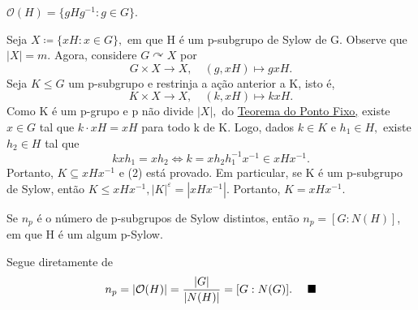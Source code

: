 \documentclass[algebra_notes.tex]{subfiles}
\begin{document}
\(\mathcal{O}(H) = \{gHg^{-1}: g\in G\}\).
\begin{proof*}
	Seja \(X\coloneqq \{xH: x\in G\},\) em que H é um p-subgrupo de Sylow de G. Observe que
	\(|X| = m.\) Agora, considere \(G \curvearrowright X\) por
	\[
		G\times X\rightarrow X,\quad (g, xH)\mapsto gxH.
	\]
	Seja \(K\leq G\) um p-subgrupo e restrinja a ação anterior a K, isto é,
	\[
		K\times X\rightarrow X,\quad (k, xH)\mapsto kxH.
	\]
	Como K é um p-grupo e p não divide \(|X|,\) do \hyperlink{fixed_point}{Teorema do Ponto Fixo,} existe
	\(x\in G\) tal que \(k \cdot xH = xH\) para todo k de K. Logo, dados \(k\in K\) e
	\(h_{1}\in H,\) existe \(h_{2}\in H\) tal que
	\[
		kxh_{1} = xh_{2} \Longleftrightarrow k = xh_{2}h_{1}^{-1}x^{-1}\in xHx^{-1}.
	\]
	Portanto, \(K\subseteq{xHx^{-1}}\) e (2) está provado. Em particular, se K é um p-subgrupo de Sylow,
	então \(K\leq xHx^{-1}, |K|^{\varepsilon } = |xHx^{-1}|\). Portanto, \(K = xHx^{-1}.\) \qedsymbol
\end{proof*}
\begin{crl*}
	Se \(n_{p}\) é o número de p-subgrupos de Sylow distintos, então \(n_{p} = [G:N(H)]\), em
	que H é um algum p-Sylow.
\end{crl*}
\begin{proof*}
	Segue diretamente de
	\[
		n_{p} = |\mathcal{O}(H)| = \frac{|G|}{|N(H)|} = [G:N(G)].\quad\text{ $\blacksquare$}
	\]
\end{proof*}
\end{document}
